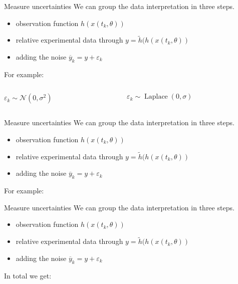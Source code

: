 \documentclass{beamer}
\newcommand{\s}{\sigma^2}
\begin{document}
  	\begin{frame}{Measure uncertainties}
    	We can group the data interpretation in three steps.
    	\begin{itemize}
    		\item observation function $h(x(t_k,\theta))$
    		\item relative experimental data through $y = \tilde{h}
    		(h(x(t_k,\theta))$
    		\item adding the noise $\overline{y}_{k} = y + \varepsilon_{k}$
    	\end{itemize}
    	For example:
    	\vspace{0.7cm}
    	\begin{columns}
  			\begin{column}{3cm}
  				$\varepsilon_{k} \sim \mathcal{N}(0,\s)$
  			\end{column}
  			\begin{column}{4cm}
 				$\varepsilon_{k} \sim \operatorname{Laplace}(0,\sigma)$
  			\end{column}
  		\end{columns}
  	\end{frame}
  	
  	\begin{frame}{Measure uncertainties}
    	We can group the data interpretation in three steps.
    	\begin{itemize}
    		\item observation function $h(x(t_k,\theta))$
    		\item relative experimental data through $y = \tilde{h}
    		(h(x(t_k,\theta))$
    		\item adding the noise $\overline{y}_{k} = y + \varepsilon_{k}$
    	\end{itemize}
    	For example:
    	\vspace{0.7cm}
  		\tcbox[colframe=red!75!black]
  		{$\epsilon_{k} \sim \mathcal{N}(0,\s)$}
  	\end{frame}
  	
  	\begin{frame}{Measure uncertainties}
    	We can group the data interpretation in three steps.
    	\begin{itemize}
    		\item observation function $h(x(t_k,\theta))$
    		\item relative experimental data through $y = \tilde{h}
    		(h(x(t_k,\theta))$
    		\item adding the noise $\overline{y}_{k} = y + \varepsilon_{k}$
    	\end{itemize}
    	In total we get:
    	\vspace{0.7cm}
  	\end{frame}
     
\end{document}

